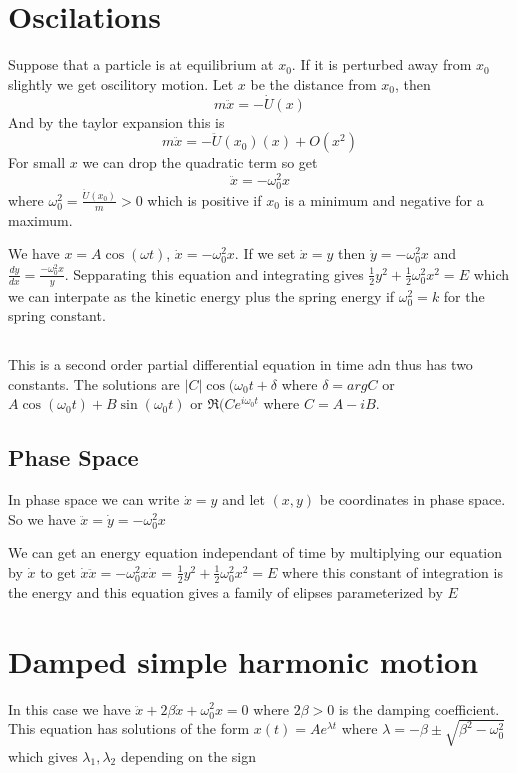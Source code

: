 \documentclass{homework}
\begin{document}
\section{Oscilations}

Suppose that a particle is at equilibrium at $x_0$. If it is perturbed away from $x_0$ slightly we get oscilitory motion. Let $x$ be the distance from $x_0$, then
\[m\ddot x = -\dot U (x)\]
And by the taylor expansion this is
\[m\ddot x = -\ddot U(x_0)(x) + O(x^2)\]
For small $x$ we can drop the quadratic term so get
\[\ddot x = -\omega_0^2 x\]
where $\omega_0^2 = \frac{\ddot U(x_0)}{m} > 0$ which is positive if $x_0$ is a minimum and negative for a maximum. 

We have $x = A \cos (\omega t)$, $\dot x = -\omega_0^2 x$. If we set $\dot x = y$ then $\dot y = -\omega_0^2 x$ and $\frac{dy}{dx} = \frac{-\omega_0^2 x}{y}$. Sepparating this equation and integrating gives $\frac{1}{2}y^2 + \frac{1}{2}\omega_0^2x^2 = E$ which we can interpate as the kinetic energy plus the spring energy if $\omega_0^2 = k$ for the spring constant. 

\subsection{}
This is a second order partial differential equation in time adn thus has two constants. The solutions are
$|C|\cos(\omega_0 t + \delta$ where $\delta = arg C$ or $A \cos (\omega_0 t) + B \sin (\omega_0 t)$ or $\Re (Ce^{i\omega_0 t}$ where $C = A - iB$.




\subsection{Phase Space}
In phase space we can write $\dot x = y$ and let $(x,y)$ be coordinates in phase space. So we have $\ddot x = \dot y =  -\omega_0^2 x$

We can get an energy equation independant of time by multiplying our equation by $\dot x$ to get $\dot x \ddot x = -\omega_0^2 x \dot x$ = $\frac{1}{2}y^2 + \frac{1}{2}\omega_0^2x^2 = E$ where this constant of integration is the energy and this equation gives a family of elipses parameterized by $E$




\section{Damped simple harmonic motion}
In this case we have $\ddot x + 2\beta \dot x + \omega_0^2 x = 0$ where $2\beta >0$ is the damping coefficient. This equation has solutions of the form $x(t) = Ae^{\lambda t}$ where $\lambda = -\beta \pm \sqrt{\beta^2 - \omega_0^2}$ which gives $\lambda_1, \lambda_2$ depending on the sign
\end{document}

